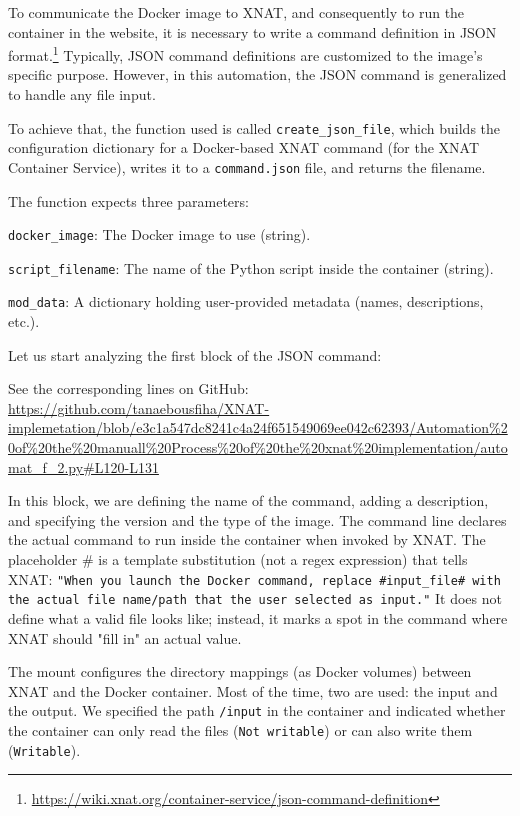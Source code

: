 To communicate the Docker image to XNAT, and consequently to run the container in the website, it is necessary to write a command definition in JSON format.\footnote{\url{ https://wiki.xnat.org/container-service/json-command-definition}}
Typically, JSON command definitions are customized to the image's specific purpose. However, in this automation, the JSON command is generalized to handle any file input.

To achieve that, the function used is called \texttt{create\_json\_file}, which builds the configuration dictionary for a Docker-based XNAT command (for the XNAT Container Service), writes it to a \texttt{command.json} file, and returns the filename.

The function expects three parameters:

\texttt{docker\_image}: The Docker image to use (string).

\texttt{script\_filename}: The name of the Python script inside the container (string).

\texttt{mod\_data}: A dictionary holding user-provided metadata (names, descriptions, etc.).

Let us start analyzing the first block of the JSON command:





\noindent\footnotesize See the corresponding lines on GitHub:\url{ https://github.com/tanaebousfiha/XNAT-implemetation/blob/e3c1a547dc8241c4a24f651549069ee042c62393/Automation%20of%20the%20manuall%20Process%20of%20the%20xnat%20implementation/automat_f_2.py#L120-L131}



In this block, we are defining the name of the command, adding a description, and specifying the version and the type of the image.
The command line declares the actual command to run inside the container when invoked by XNAT. The placeholder \# is a template substitution (not a regex expression) that tells XNAT: \texttt{"When you launch the Docker command, replace \#input\_file\# with the actual file name/path that the user selected as input."} It does not define what a valid file looks like; instead, it marks a spot in the command where XNAT should "fill in" an actual value.


The mount configures the directory mappings (as Docker volumes) between XNAT and the Docker container. Most of the time, two are used: the input and the output.
We specified the path \texttt{/input} in the container and indicated whether the container can only read the files (\texttt{Not writable}) or can also write them (\texttt{Writable}).

